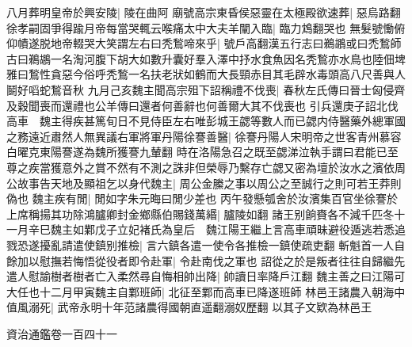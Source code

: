 八月葬明皇帝於興安陵|{
	陵在曲阿}
廟號高宗東昏侯惡靈在太極殿欲速葬|{
	惡烏路翻}
徐孝嗣固爭得踰月帝每當哭輒云喉痛太中大夫羊闡入臨|{
	臨力鴆翻哭也}
無髮號慟俯仰幘遂脱地帝輟哭大笑謂左右曰秃鶖啼來乎|{
	號戶高翻漢五行志曰鵜鶘或曰禿鶖師古曰鵜鶘一名淘河腹下胡大如數升囊好羣入澤中抒水食魚因名秃鶖亦水鳥也陸佃埤雅曰鶖性貪惡今俗呼秃鶖一名扶老狀如鶴而大長頸赤目其毛辟水毒頭高八尺善與人鬬好㗖蛇鶖音秋}
九月己亥魏主聞高宗殂下詔稱禮不伐喪|{
	春秋左氏傳曰晉士匈侵齊及穀聞喪而還禮也公羊傳曰還者何善辭也何善爾大其不伐喪也}
引兵還庚子詔北伐高車　魏主得疾甚篤旬日不見侍臣左右唯彭城王勰等數人而已勰内侍醫藥外總軍國之務遠近肅然人無異議右軍將軍丹陽徐謇善醫|{
	徐謇丹陽人宋明帝之世客青州慕容白曜克東陽謇遂為魏所獲謇九輦翻}
時在洛陽急召之既至勰涕泣執手謂曰君能已至尊之疾當獲意外之賞不然有不測之誅非但榮辱乃繫存亡勰又密為壇於汝水之濱依周公故事告天地及顯祖乞以身代魏主|{
	周公金縢之事以周公之至誠行之則可若王莽則偽也}
魏主疾有閒|{
	閒如字朱元晦曰閒少差也}
丙午發懸瓠舍於汝濱集百官坐徐謇於上席稱揚其功除鴻臚卿封金鄉縣伯賜錢萬緡|{
	臚陵如翻}
諸王别餉賚各不減千匹冬十一月辛巳魏主如鄴戊子立妃褚氏為皇后　魏江陽王繼上言高車頑昧避役遁逃若悉追戮恐遂擾亂請遣使鎮别推檢|{
	言六鎮各遣一使令各推檢一鎮使疏吏翻}
斬魁首一人自餘加以慰撫若悔悟從役者即令赴軍|{
	令赴南伐之軍也}
詔從之於是叛者往往自歸繼先遣人慰諭樹者樹者亡入柔然尋自悔相帥出降|{
	帥讀日率降戶江翻}
魏主善之曰江陽可大任也十二月甲寅魏主自鄴班師|{
	北征至鄴而高車已降遂班師}
林邑王諸農入朝海中值風溺死|{
	武帝永明十年范諸農得國朝直遥翻溺奴歷翻}
以其子文欵為林邑王

資治通鑑卷一百四十一
